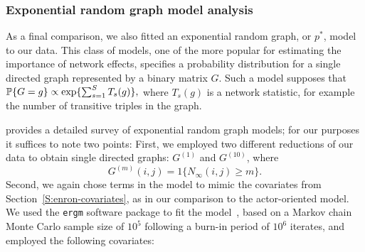 \documentclass[final]{statsoc}
\begin{document}
\subsubsection{Exponential random graph model analysis}

As a final comparison, we also fitted an exponential random graph, or $p^\ast$, model to our data.  This class of models, one of the more popular for estimating the importance of network effects, specifies a probability distribution for a single directed graph represented by a binary matrix $G$.  Such a model supposes that
$
\mathbb{P}\{ G = g \} \propto \exp\{ \sum_{s=1}^S T_s(g)
\},
$
where $T_s(g)$ is a network statistic, for example the number of transitive triples in the graph.

\cite{anderson1999pstar} provides a detailed survey of exponential random graph models; for our purposes it suffices to note two points:  First, we employed two different reductions of our data to obtain single directed graphs: $G^{(1)}$ and $G^{(10)}$, where
\[
  G^{(m)}(i,j) = 1\{ N_\infty(i,j) \geq m \}.
\]
Second, we again chose terms in the model to mimic the covariates from
Section~\ref{S:enron-covariates}, as in our comparison to the actor-oriented
model.  We used the \texttt{ergm} software package to fit the
model~\citep{ergm2011}, based on a Markov chain Monte Carlo sample size of
$10^5$ following a burn-in period of $10^6$ iterates, and employed the following covariates:
\end{document}
